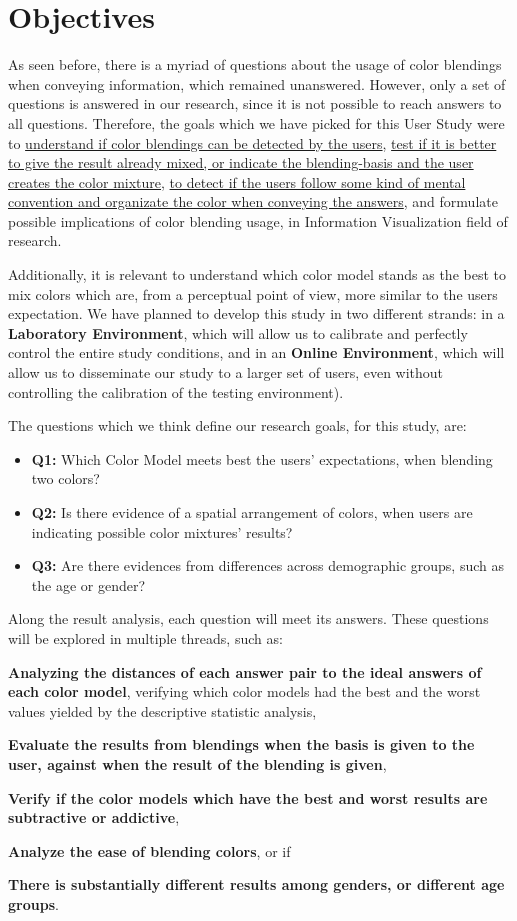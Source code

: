 \section{Objectives}
\label{sec:impl_objectives}
%
As seen before, there is a myriad of questions about the usage of color blendings when conveying information,
which remained unanswered. However, only a set of questions is answered in our research, since it is not possible
to reach answers to all questions. Therefore, the goals which we have picked for this User Study were to
\ul{understand if color blendings can be detected by the users}, \ul{test if it is better to give the result
already mixed, or indicate the blending-basis and the user creates the color mixture}, \ul{to detect if the users
follow some kind of mental convention and organizate the color when conveying the answers}, and formulate possible
implications of color blending usage, in Information Visualization field of research. \par
%
Additionally, it is relevant to understand which color model stands as the best to mix colors which are, from a
perceptual point of view, more similar to the users expectation. We have planned to develop this study in two
different strands: in a \textbf{Laboratory Environment}, which will allow us to calibrate and perfectly control the
entire study conditions, and in an \textbf{Online Environment}, which will allow us to disseminate our study to a
larger set of users, even without controlling the calibration of the testing environment). \par
%
The questions which we think define our research goals, for this study, are:
%
\begin{itemize}
	\item \textbf{Q1:} Which Color Model meets best the users' expectations, when blending two colors?
	\item \textbf{Q2:} Is there evidence of a spatial arrangement of colors, when users are indicating possible color
	mixtures' results?
	\item \textbf{Q3:} Are there evidences from differences across demographic groups, such as the age or gender?
\end{itemize}
%
Along the result analysis, each question will meet its answers. These questions will be explored in multiple
threads, such as:
%
\begin{enumerate*}
		\item \textbf{Analyzing the distances of each answer pair to the ideal answers of each color model}, verifying
		which color models had the best and the worst values yielded by the descriptive statistic analysis,
		\item \textbf{Evaluate the results from blendings when the basis is given to the user, against when the result
		of the blending is given},
		\item \textbf{Verify if the color models which have the best and worst results are subtractive or addictive},
		\item \textbf{Analyze the ease of blending colors}, or if
		\item \textbf{There is substantially different results among genders, or different age groups}.
\end{enumerate*}
